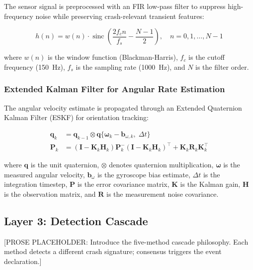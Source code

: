 \documentclass[conference,twocolumn]{IEEEtran}
\newcommand{\vect}[1]{\boldsymbol{#1}}
\newcommand{\mat}[1]{\mathbf{#1}}
\begin{document}
The sensor signal is preprocessed with an FIR low-pass filter to suppress high-frequency noise while preserving crash-relevant transient features:

\begin{equation}
\label{eq:fir}
h(n) = w(n) \cdot \operatorname{sinc}\!\left(\frac{2f_c n}{f_s} - \frac{N-1}{2}\right), \quad n = 0, 1, \ldots, N-1
\end{equation}

where $w(n)$ is the window function (Blackman-Harris), $f_c$ is the cutoff frequency (\SI{150}{\hertz}), $f_s$ is the sampling rate (\SI{1000}{\hertz}), and $N$ is the filter order.

\subsubsection{Extended Kalman Filter for Angular Rate Estimation}

The angular velocity estimate is propagated through an Extended Quaternion Kalman Filter (ESKF) for orientation tracking:

\begin{align}
\label{eq:eskf-propagate}
\vect{q}_{k} &= \vect{q}_{k-1} \otimes \vect{q}\{\vect{\omega}_k - \vect{b}_{\omega,k},\; \Delta t\} \\
\label{eq:eskf-covariance}
\mat{P}_k &= \left(\mat{I} - \mat{K}_k \mat{H}_k\right) \mat{P}_k^- \left(\mat{I} - \mat{K}_k \mat{H}_k\right)^\top + \mat{K}_k \mat{R}_k \mat{K}_k^\top
\end{align}

where $\vect{q}$ is the unit quaternion, $\otimes$ denotes quaternion multiplication, $\vect{\omega}$ is the measured angular velocity, $\vect{b}_\omega$ is the gyroscope bias estimate, $\Delta t$ is the integration timestep, $\mat{P}$ is the error covariance matrix, $\mat{K}$ is the Kalman gain, $\mat{H}$ is the observation matrix, and $\mat{R}$ is the measurement noise covariance.

\subsection{Layer 3: Detection Cascade}

[PROSE PLACEHOLDER: Introduce the five-method cascade philosophy. Each method detects a different crash signature; consensus triggers the event declaration.]
\end{document}
